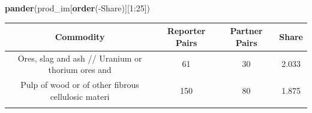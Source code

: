 \documentclass[10pt,]{article}
\newenvironment{Shaded}{\begin{snugshade}}{\end{snugshade}}
\newcommand{\KeywordTok}[1]{\textcolor[rgb]{0.13,0.29,0.53}{\textbf{{#1}}}}
\newcommand{\DecValTok}[1]{\textcolor[rgb]{0.00,0.00,0.81}{{#1}}}
\newcommand{\NormalTok}[1]{{#1}}
\begin{document}
\begin{Shaded}
\begin{Highlighting}[]
\KeywordTok{pander}\NormalTok{(prod_im[}\KeywordTok{order}\NormalTok{(-Share)][}\DecValTok{1}\NormalTok{:}\DecValTok{25}\NormalTok{])}
\end{Highlighting}
\end{Shaded}

\begin{longtable}[]{@{}cccc@{}}
\toprule
\begin{minipage}[b]{0.38\columnwidth}\centering\strut
Commodity\strut
\end{minipage} & \begin{minipage}[b]{0.21\columnwidth}\centering\strut
Reporter Pairs\strut
\end{minipage} & \begin{minipage}[b]{0.20\columnwidth}\centering\strut
Partner Pairs\strut
\end{minipage} & \begin{minipage}[b]{0.09\columnwidth}\centering\strut
Share\strut
\end{minipage}\tabularnewline
\midrule
\endhead
\begin{minipage}[t]{0.38\columnwidth}\centering\strut
Ores, slag and ash // Uranium or thorium ores and\strut
\end{minipage} & \begin{minipage}[t]{0.21\columnwidth}\centering\strut
61\strut
\end{minipage} & \begin{minipage}[t]{0.20\columnwidth}\centering\strut
30\strut
\end{minipage} & \begin{minipage}[t]{0.09\columnwidth}\centering\strut
2.033\strut
\end{minipage}\tabularnewline
\begin{minipage}[t]{0.38\columnwidth}\centering\strut
Pulp of wood or of other fibrous cellulosic materi\strut
\end{minipage} & \begin{minipage}[t]{0.21\columnwidth}\centering\strut
150\strut
\end{minipage} & \begin{minipage}[t]{0.20\columnwidth}\centering\strut
80\strut
\end{minipage} & \begin{minipage}[t]{0.09\columnwidth}\centering\strut
1.875\strut
\end{minipage}\tabularnewline
\begin{minipage}[t]{0.38\columnwidth}\centering\strut

\end{minipage}
\end{longtable}
\end{document}
